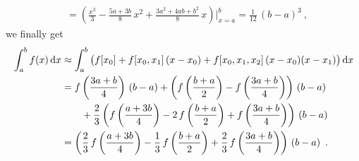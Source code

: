 {\begin{align*}
&= \left(\frac{x^3}{3} -\frac{5a+3b}{8}\, x^2 + \frac{3a^2+4ab+b^2}{8}\, x
\right)\bigg|_{x=a}^b
=\frac{1}{12}\,\left(b-a\right)^3 \ ,
\end{align*}
we finally get
\begin{align*}
\int_a^b f(x) \,\mathrm{d}x & \approx \int_a^b \big(
f[x_0] + f[x_0,x_1]\,(x-x_0) + f[x_0,x_1,x_2]\,(x-x_0)(x-x_1) \big)\,\mathrm{d}x \\
&= f\left(\frac{3a+b}{4}\right) \, (b-a)
+ \left(f\left(\frac{b+a}{2}\right) - f\left(\frac{3a+b}{4}\right)\right)
\, \left(b-a\right) \\
&\qquad + \frac{2}{3}
\left(f\left(\frac{a+3b}{4}\right)
- 2\,f\left(\frac{b+a}{2}\right)
+ f\left(\frac{3a+b}{4}\right)\right)
\,\left(b-a\right) \\
&= \left(\frac{2}{3}\, f\left(\frac{a+3b}{4}\right)
- \frac{1}{3}\,f\left(\frac{b+a}{2}\right)
+ \frac{2}{3}\,f\left(\frac{3a+b}{4}\right)\right)
\,\left(b-a\right) \ .
\end{align*}

}
